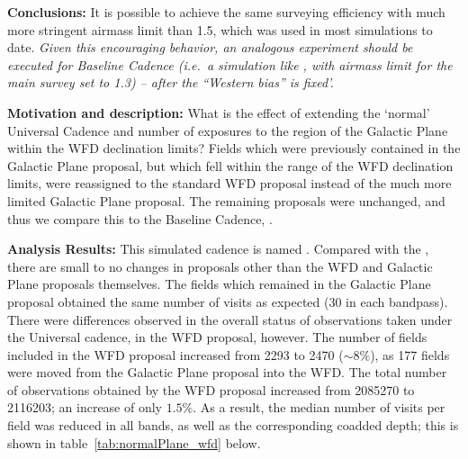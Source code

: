 {\bf Conclusions:}  It is possible to achieve the same surveying
efficiency with much more stringent airmass limit than 1.5, which was
used in most simulations to date.  {\it Given this encouraging
behavior, an analogous experiment should be executed for Baseline
Cadence (i.e.\ a simulation like , with airmass
limit for the main survey set to 1.3) -- after the ``Western bias'' is
fixed'.}




{\bf Motivation and description:} What is the effect of extending the
`normal' Universal Cadence and number of exposures to the region of the
Galactic Plane within the WFD declination limits?  Fields which were
previously contained in the Galactic Plane proposal, but which fell
within the range of the WFD declination limits, were reassigned to the
standard WFD proposal instead of the much more limited Galactic Plane
proposal. The remaining proposals were unchanged, and thus we compare
this to the Baseline Cadence, .

 {\bf Analysis Results:}  This simulated cadence is named
 . Compared with the
 , there are small to no changes in
 proposals other than the WFD and Galactic Plane proposals
 themselves. The fields which remained in the Galactic Plane proposal
 obtained the same number of visits as expected (30 in each
 bandpass). There were differences observed in the overall status of
 observations taken under the Universal cadence, in the WFD proposal,
 however. The number of fields included in the WFD proposal increased
 from 2293 to 2470 ($\sim8\%$), as 177 fields were moved from the Galactic Plane
 proposal into the WFD. The total number of observations obtained by
 the WFD proposal increased from 2085270 to 2116203; an increase of
 only $1.5\%$. As a result, the median number of visits per field was
 reduced in all bands, as well as the corresponding coadded depth;
 this is shown in table~\ref{tab:normalPlane_wfd} below.

